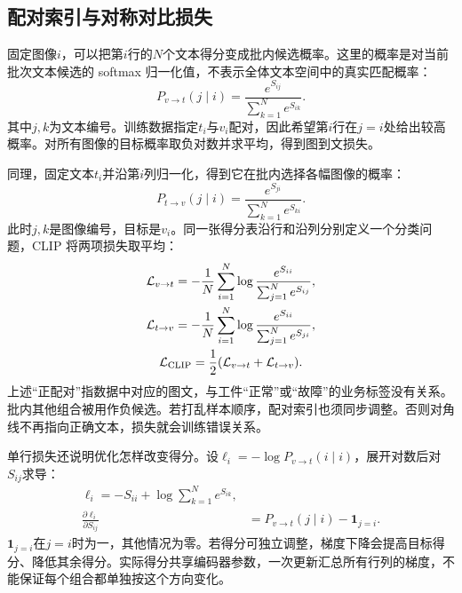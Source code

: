 \subsection{配对索引与对称对比损失}
固定图像$i$，可以把第$i$行的$N$个文本得分变成批内候选概率。这里的概率是对当前批次文本候选的 softmax 归一化值，不表示全体文本空间中的真实匹配概率：
\begin{equation}
 P_{v\to t}(j\mid i)=\frac{e^{S_{ij}}}{\sum_{k=1}^N e^{S_{ik}}}.
\end{equation}
其中$j,k$为文本编号。训练数据指定$t_i$与$v_i$配对，因此希望第$i$行在$j=i$处给出较高概率。对所有图像的目标概率取负对数并求平均，得到图到文损失。

同理，固定文本$t_i$并沿第$i$列归一化，得到它在批内选择各幅图像的概率：
\begin{equation}
 P_{t\to v}(j\mid i)=\frac{e^{S_{ji}}}{\sum_{k=1}^N e^{S_{ki}}}.
\end{equation}
此时$j,k$是图像编号，目标是$v_i$。同一张得分表沿行和沿列分别定义一个分类问题，CLIP 将两项损失取平均：
\begin{gather}
 \mathcal L_{v\to t}=-\frac1N\sum_{i=1}^N
 \log\frac{e^{S_{ii}}}{\sum_{j=1}^N e^{S_{ij}}},\\
 \mathcal L_{t\to v}=-\frac1N\sum_{i=1}^N
 \log\frac{e^{S_{ii}}}{\sum_{j=1}^N e^{S_{ji}}},\\
 \mathcal L_{\rm CLIP}=\frac12
 (\mathcal L_{v\to t}+\mathcal L_{t\to v}).
 \label{eq:multimodal-clip-loss}
\end{gather}
上述“正配对”指数据中对应的图文，与工件“正常”或“故障”的业务标签没有关系。批内其他组合被用作负候选。若打乱样本顺序，配对索引也须同步调整。否则对角线不再指向正确文本，损失就会训练错误关系。

单行损失还说明优化怎样改变得分。设$\ell_i=-\log P_{v\to t}(i\mid i)$，展开对数后对$S_{ij}$求导：
\begin{align}
 \ell_i=-S_{ii}+\log\sum_{k=1}^N e^{S_{ik}},\\
 \frac{\partial\ell_i}{\partial S_{ij}}
 &=P_{v\to t}(j\mid i)-\mathbf1_{j=i}.
 \label{eq:multimodal-clip-score-gradient}
\end{align}
$\mathbf1_{j=i}$在$j=i$时为一，其他情况为零。若得分可独立调整，梯度下降会提高目标得分、降低其余得分。实际得分共享编码器参数，一次更新汇总所有行列的梯度，不能保证每个组合都单独按这个方向变化。

